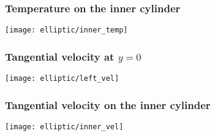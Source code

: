 \documentclass[mathserif]{beamer} %
\begin{document}
\begin{frame}
    \frametitle{Temperature on the inner cylinder}
    \centering
    \texttt{[image: elliptic/inner\_temp]}
\end{frame}

\begin{frame}
    \frametitle{Tangential velocity at \(y=0\)}
    \centering
    \texttt{[image: elliptic/left\_vel]}
\end{frame}

\begin{frame}
    \frametitle{Tangential velocity on the inner cylinder}
    \centering
    \texttt{[image: elliptic/inner\_vel]}
\end{frame}
\end{document}
